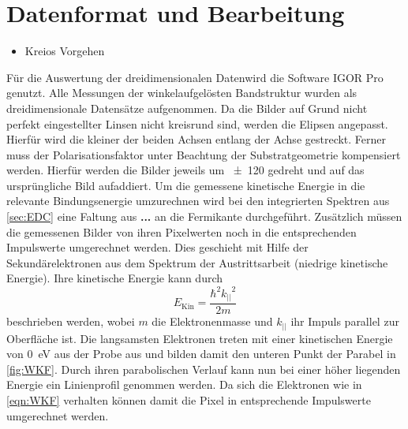     \section{Datenformat und Bearbeitung}
    \begin{itemize}
        \item Kreios Vorgehen
    \end{itemize}
        Für die Auswertung der dreidimensionalen Datenwird die Software IGOR Pro \cite{IGOR} genutzt.
        Alle Messungen der winkelaufgelösten Bandstruktur wurden als dreidimensionale Datensätze aufgenommen.
        Da die Bilder auf Grund nicht perfekt eingestellter Linsen nicht kreisrund sind, werden die Elipsen angepasst.
        Hierfür wird die kleiner der beiden Achsen entlang der Achse gestreckt.
        Ferner muss der Polarisationsfaktor unter Beachtung der Substratgeometrie kompensiert werden.
        Hierfür werden die Bilder jeweils um \SI{\pm120}{} gedreht und auf das ursprüngliche Bild aufaddiert.
        Um die gemessene kinetische Energie in die relevante Bindungsenergie umzurechnen wird bei den integrierten Spektren aus \autoref{sec:EDC} eine Faltung aus \textbf{...} an die Fermikante durchgeführt.
        Zusätzlich müssen die gemessenen Bilder von ihren Pixelwerten noch in die entsprechenden Impulswerte umgerechnet werden.
        Dies geschieht mit Hilfe der Sekundärelektronen aus dem Spektrum der Austrittsarbeit (niedrige kinetische Energie).
        Ihre kinetische Energie kann durch 
        \begin{equation}
            E_\text{Kin} = \frac{\hbar^2 {k_{||}}^2}{2 m}
            \label{eqn:WKF}
        \end{equation}
        beschrieben werden, wobei $m$ die Elektronenmasse und $k_{||}$ ihr Impuls parallel zur Oberfläche ist.
        Die langsamsten Elektronen treten mit einer kinetischen Energie von \SI{0}{\electronvolt} aus der Probe aus und bilden damit den unteren Punkt der Parabel in \autoref{fig:WKF}.
        Durch ihren parabolischen Verlauf kann nun bei einer höher liegenden Energie ein Linienprofil genommen werden.
        Da sich die Elektronen wie in \autoref{eqn:WKF} verhalten können damit die Pixel in entsprechende Impulswerte umgerechnet werden.


